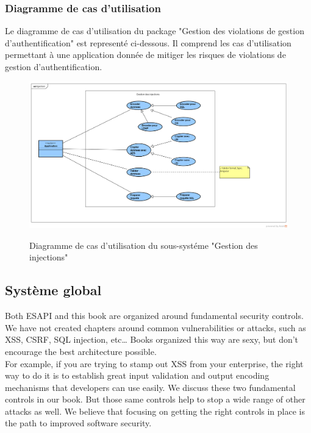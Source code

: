 \subsubsection{Diagramme de cas d'utilisation}
Le diagramme de cas d'utilisation du package "Gestion des violations de gestion d'authentification" est representé ci-dessous. Il comprend les cas d'utilisation permettant à une application donnée de mitiger les risques de violations de gestion d'authentification.\\ 
\begin{figure}[h!]
	\centering
	\begin{minipage}{12cm}
		\centering
		{\includegraphics[height=0.27\textheight]{fig/Injection-use-case-diagram.png}}
	\end{minipage}
	\caption{Diagramme de cas d'utilisation du sous-systéme "Gestion des injections"}
	\label{fig:8.1}
\end{figure}

\subsection{Système global}
Both ESAPI and this book are organized around fundamental security controls. We have not created
chapters around common vulnerabilities or attacks, such as XSS, CSRF, SQL injection, etc… Books
organized this way are sexy, but don’t encourage the best architecture possible. \\
For example, if you are trying to stamp out XSS from your enterprise, the right way to do it is to establish great input validation and output encoding mechanisms that developers can use easily. We discuss these two fundamental controls in our book. But those same controls help to stop a wide range of other attacks as well. We believe that focusing on getting the right controls in place is the path to improved software security. 